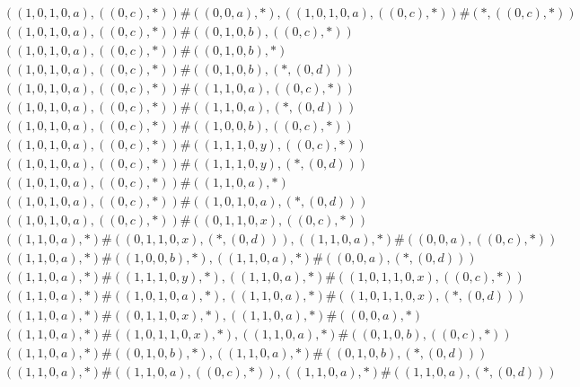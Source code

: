 \begin{align*}
	 & \qquad ((1, 0, 1, 0, a), ((0, c), *)) \# ((0, 0, a), *), ((1, 0, 1, 0, a), ((0, c), *)) \# (*, ((0, c), *)) \\ 
	 & \qquad ((1, 0, 1, 0, a), ((0, c), *)) \# ((0, 1, 0, b), ((0, c), *)) \\ 
	 & \qquad ((1, 0, 1, 0, a), ((0, c), *)) \# ((0, 1, 0, b), *) \\ 
	 & \qquad ((1, 0, 1, 0, a), ((0, c), *)) \# ((0, 1, 0, b), (*, (0, d))) \\ 
	 & \qquad ((1, 0, 1, 0, a), ((0, c), *)) \# ((1, 1, 0, a), ((0, c), *)) \\ 
	 & \qquad ((1, 0, 1, 0, a), ((0, c), *)) \# ((1, 1, 0, a), (*, (0, d))) \\ 
	 & \qquad ((1, 0, 1, 0, a), ((0, c), *)) \# ((1, 0, 0, b), ((0, c), *)) \\ 
	 & \qquad ((1, 0, 1, 0, a), ((0, c), *)) \# ((1, 1, 1, 0, y), ((0, c), *)) \\ 
	 & \qquad ((1, 0, 1, 0, a), ((0, c), *)) \# ((1, 1, 1, 0, y), (*, (0, d))) \\ 
	 & \qquad ((1, 0, 1, 0, a), ((0, c), *)) \# ((1, 1, 0, a), *) \\ 
	 & \qquad ((1, 0, 1, 0, a), ((0, c), *)) \# ((1, 0, 1, 0, a), (*, (0, d))) \\ 
	 & \qquad ((1, 0, 1, 0, a), ((0, c), *)) \# ((0, 1, 1, 0, x), ((0, c), *)) \\ 
	 & \qquad ((1, 1, 0, a), *) \# ((0, 1, 1, 0, x), (*, (0, d))), ((1, 1, 0, a), *) \# ((0, 0, a), ((0, c), *)) \\ 
	 & \qquad ((1, 1, 0, a), *) \# ((1, 0, 0, b), *), ((1, 1, 0, a), *) \# ((0, 0, a), (*, (0, d))) \\ 
	 & \qquad ((1, 1, 0, a), *) \# ((1, 1, 1, 0, y), *), ((1, 1, 0, a), *) \# ((1, 0, 1, 1, 0, x), ((0, c), *)) \\ 
	 & \qquad ((1, 1, 0, a), *) \# ((1, 0, 1, 0, a), *), ((1, 1, 0, a), *) \# ((1, 0, 1, 1, 0, x), (*, (0, d))) \\ 
	 & \qquad ((1, 1, 0, a), *) \# ((0, 1, 1, 0, x), *), ((1, 1, 0, a), *) \# ((0, 0, a), *) \\ 
	 & \qquad ((1, 1, 0, a), *) \# ((1, 0, 1, 1, 0, x), *), ((1, 1, 0, a), *) \# ((0, 1, 0, b), ((0, c), *)) \\ 
	 & \qquad ((1, 1, 0, a), *) \# ((0, 1, 0, b), *), ((1, 1, 0, a), *) \# ((0, 1, 0, b), (*, (0, d))) \\ 
	 & \qquad ((1, 1, 0, a), *) \# ((1, 1, 0, a), ((0, c), *)), ((1, 1, 0, a), *) \# ((1, 1, 0, a), (*, (0, d))) \\ 

\end{align*}
